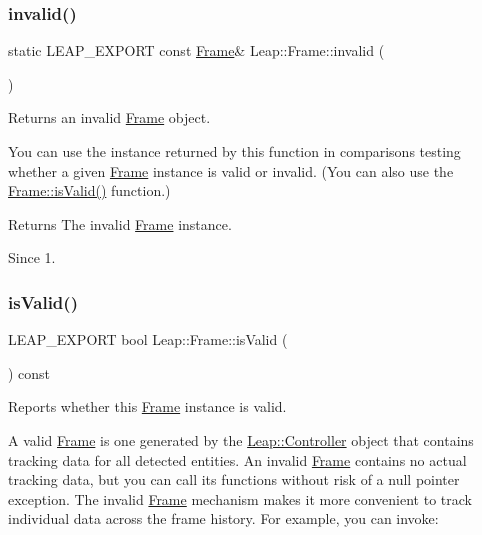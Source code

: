 \subsubsection{\texorpdfstring{invalid()}{invalid()}}
{\footnotesize\ttfamily static L\+E\+A\+P\+\_\+\+E\+X\+P\+O\+RT const \hyperlink{class_leap_1_1_frame}{Frame}\& Leap\+::\+Frame\+::invalid (\begin{DoxyParamCaption}{ }\end{DoxyParamCaption})\hspace{0.3cm}{\ttfamily [static]}}

Returns an invalid \hyperlink{class_leap_1_1_frame}{Frame} object.

You can use the instance returned by this function in comparisons testing whether a given \hyperlink{class_leap_1_1_frame}{Frame} instance is valid or invalid. (You can also use the \hyperlink{class_leap_1_1_frame_a837bf075a6befadf3337ae07ca3b2891}{Frame\+::is\+Valid()} function.)


\begin{DoxyCodeInclude}
\end{DoxyCodeInclude}


\begin{DoxyReturn}{Returns}
The invalid \hyperlink{class_leap_1_1_frame}{Frame} instance. 
\end{DoxyReturn}
\begin{DoxySince}{Since}
1. 
\end{DoxySince}
\mbox{\label{class_leap_1_1_frame_a837bf075a6befadf3337ae07ca3b2891}} 
\subsubsection{\texorpdfstring{is\+Valid()}{isValid()}}
{\footnotesize\ttfamily L\+E\+A\+P\+\_\+\+E\+X\+P\+O\+RT bool Leap\+::\+Frame\+::is\+Valid (\begin{DoxyParamCaption}{ }\end{DoxyParamCaption}) const}

Reports whether this \hyperlink{class_leap_1_1_frame}{Frame} instance is valid.

A valid \hyperlink{class_leap_1_1_frame}{Frame} is one generated by the \hyperlink{class_leap_1_1_controller}{Leap\+::\+Controller} object that contains tracking data for all detected entities. An invalid \hyperlink{class_leap_1_1_frame}{Frame} contains no actual tracking data, but you can call its functions without risk of a null pointer exception. The invalid \hyperlink{class_leap_1_1_frame}{Frame} mechanism makes it more convenient to track individual data across the frame history. For example, you can invoke\+:


